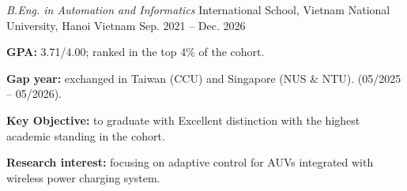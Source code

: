 \begin{cventries}

  \cventry
    {\textit{B.Eng. in Automation and Informatics}}
    {International School, Vietnam National University, Hanoi}
    {Vietnam}
    {Sep. 2021 -- Dec. 2026}
    {
      \begin{cvitems}
        \item {\textbf{GPA:} 3.71/4.00; ranked in the top 4\% of the cohort.}
        \item {\textbf{Gap year: } exchanged in Taiwan (CCU) and Singapore (NUS \& NTU). (05/2025 -- 05/2026).}
        \item {\textbf{Key Objective:} to graduate with Excellent distinction with the highest academic standing in the cohort.}
        \item {\textbf{Research interest:} focusing on adaptive control for AUVs integrated with wireless power charging system.}
      \end{cvitems}
    }

\end{cventries}
